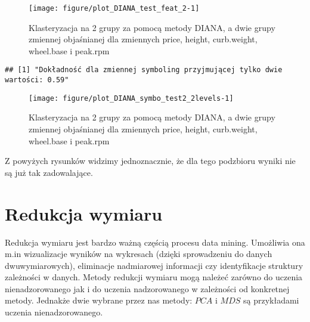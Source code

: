 \documentclass[12pt, a4paper]{article}\usepackage[]{graphicx}\usepackage[]{xcolor}
\makeatletter
\def\maxwidth{ %
  \ifdim\Gin@nat@width>\linewidth
    \linewidth
  \else
    \Gin@nat@width
  \fi
}
\newenvironment{kframe}{%
 \def\at@end@of@kframe{}%
 \ifinner\ifhmode%
  \def\at@end@of@kframe{\end{minipage}}%
  \begin{minipage}{\columnwidth}%
 \fi\fi%
 \def\FrameCommand##1{\hskip\@totalleftmargin \hskip-\fboxsep
 \colorbox{shadecolor}{##1}\hskip-\fboxsep
     \hskip-\linewidth \hskip-\@totalleftmargin \hskip\columnwidth}%
 \MakeFramed {\advance\hsize-\width
   \@totalleftmargin\z@ \linewidth\hsize
   \@setminipage}}%
 {\par\unskip\endMakeFramed%
 \at@end@of@kframe}
\newenvironment{knitrout}{}{} %
\makeatother
\begin{document}
\begin{knitrout}
\color{fgcolor}\begin{figure}[H]

{\centering \texttt{[image: figure/plot\_DIANA\_test\_feat\_2-1]} 

}

\caption[Klasteryzacja na 2 grupy za pomocą metody DIANA, a dwie grupy zmiennej objaśnianej dla zmiennych price, height, curb.weight, wheel.base i peak.rpm]{Klasteryzacja na 2 grupy za pomocą metody DIANA, a dwie grupy zmiennej objaśnianej dla zmiennych price, height, curb.weight, wheel.base i peak.rpm}\label{fig:plot_DIANA_test_feat_2}
\end{figure}

\begin{kframe}\begin{verbatim}
## [1] "Dokładność dla zmiennej symboling przyjmującej tylko dwie wartości: 0.59"
\end{verbatim}
\end{kframe}
\end{knitrout}

\begin{knitrout}
\color{fgcolor}\begin{figure}[H]

{\centering \texttt{[image: figure/plot\_DIANA\_symbo\_test2\_2levels-1]} 

}

\caption[Klasteryzacja na 2 grupy za pomocą metody DIANA, a dwie grupy zmiennej objaśnianej dla zmiennych price, height, curb.weight, wheel.base i peak.rpm]{Klasteryzacja na 2 grupy za pomocą metody DIANA, a dwie grupy zmiennej objaśnianej dla zmiennych price, height, curb.weight, wheel.base i peak.rpm}\label{fig:plot_DIANA_symbo_test2_2levels}
\end{figure}

\end{knitrout}

Z powyżych rysunków widzimy jednoznacznie, że dla tego podzbioru wyniki nie są już tak zadowalające. 

\section{Redukcja wymiaru}

Redukcja wymiaru jest bardzo ważną częścią procesu data mining. Umożliwia ona m.in wizualizacje wyników na wykresach (dzięki sprowadzeniu do danych dwuwymiarowych), eliminacje nadmiarowej informacji czy identyfikacje struktury zależności w danych. Metody redukcji wymiaru mogą należeć zarówno do uczenia nienadzorowanego jak i do uczenia nadzorowanego w zależności od konkretnej metody. Jednakże dwie wybrane przez nas metody: $PCA$ i $MDS$ są przykładami uczenia nienadzorowanego.
\end{document}
